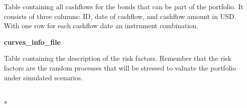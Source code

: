 \documentclass[letterpaper,10pt,english]{/anaconda/lib/python2.7/site-packages/sphinx/texinputs/sphinxhowto}
\def\smaller{\fontsize{9.5pt}{9.5pt}\selectfont}
\begin{document}
Table containing all cashflows for the bonds that can be part of the
portfolio. It consists of three columns: ID, date of cashflow, and
cashflow amount in USD. With one row for each cashflow date an
instrument combination.

\textbf{curves\_info\_file}

Table containing the description of the risk factors. Remember that the
risk factors are the random processes that will be stressed to valuate
the portfolio under simulated scenarios.


    
        \vspace{6pt}
        \makebox[0.1\linewidth]{\smaller\hfill\tt\color{nbframe-in-prompt}In\hspace{4pt}{[}20{]}:\hspace{4pt}}\\*
        \vspace{-2.65\baselineskip}
\end{document}

